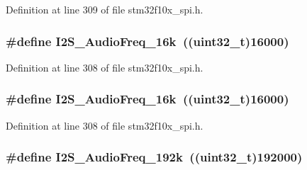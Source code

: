 Definition at line 309 of file stm32f10x\+\_\+spi.\+h.

\subsubsection[{\texorpdfstring{I2\+S\+\_\+\+Audio\+Freq\+\_\+16k}{I2S_AudioFreq_16k}}]{\setlength{\rightskip}{0pt plus 5cm}\#define I2\+S\+\_\+\+Audio\+Freq\+\_\+16k~(({\bf uint32\+\_\+t})16000)}\hypertarget{group___i2_s___audio___frequency_ga5b8f2f8393e022becf0dbb04d1b01950}{}\label{group___i2_s___audio___frequency_ga5b8f2f8393e022becf0dbb04d1b01950}


Definition at line 308 of file stm32f10x\+\_\+spi.\+h.

\subsubsection[{\texorpdfstring{I2\+S\+\_\+\+Audio\+Freq\+\_\+16k}{I2S_AudioFreq_16k}}]{\setlength{\rightskip}{0pt plus 5cm}\#define I2\+S\+\_\+\+Audio\+Freq\+\_\+16k~(({\bf uint32\+\_\+t})16000)}\hypertarget{group___i2_s___audio___frequency_ga5b8f2f8393e022becf0dbb04d1b01950}{}\label{group___i2_s___audio___frequency_ga5b8f2f8393e022becf0dbb04d1b01950}


Definition at line 308 of file stm32f10x\+\_\+spi.\+h.

\subsubsection[{\texorpdfstring{I2\+S\+\_\+\+Audio\+Freq\+\_\+192k}{I2S_AudioFreq_192k}}]{\setlength{\rightskip}{0pt plus 5cm}\#define I2\+S\+\_\+\+Audio\+Freq\+\_\+192k~(({\bf uint32\+\_\+t})192000)}\hypertarget{group___i2_s___audio___frequency_gadfdaed9a2acb71f2cdd737be81a6f747}{}\label{group___i2_s___audio___frequency_gadfdaed9a2acb71f2cdd737be81a6f747}


